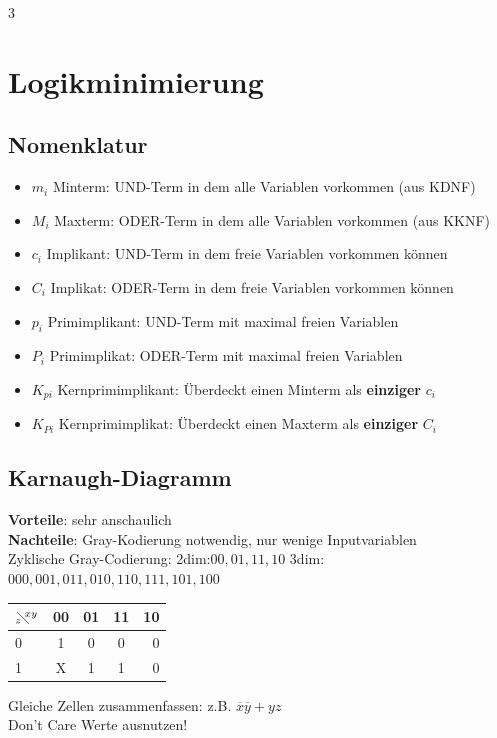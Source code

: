 \documentclass[6pt,a4paper]{scrartcl}
\begin{document}
\begin{multicols*}{3}
	\section{Logikminimierung}
	\subsection{Nomenklatur}
	\begin{itemize}\itemsep0pt
		\item $m_i$ Minterm: UND-Term in dem alle Variablen vorkommen (aus KDNF)
		\item $M_i$ Maxterm: ODER-Term in dem alle Variablen vorkommen (aus KKNF)
		\item $c_i$ Implikant: UND-Term in dem freie Variablen vorkommen können
		\item $C_i$ Implikat: ODER-Term in dem freie Variablen vorkommen können
		\item $p_i$ Primimplikant: UND-Term mit maximal freien Variablen
		\item $P_i$ Primimplikat: ODER-Term mit maximal freien Variablen
		\item $K_{pi}$ Kernprimimplikant: Überdeckt einen Minterm als \textbf{einziger} $c_i$
		\item $K_{Pi}$ Kernprimimplikat: Überdeckt einen Maxterm als \textbf{einziger} $C_i$
	\end{itemize}

	\subsection{Karnaugh-Diagramm} %
	\textbf{Vorteile}: sehr anschaulich\\
	\textbf{Nachteile}: Gray-Kodierung notwendig, nur wenige Inputvariablen\\
	Zyklische Gray-Codierung: 2dim:$00,01,11,10$ 3dim:$000,001,011,010,110,111,101,100$

	\begin{tabular}{l | c | c |  c | r}
		$_z\!\!\diagdown \!\!^{xy}$ & 00                 & 01                      & 11                      & 10 \\ \midrule
		0                           & 1 \cellcolor{gray} & 0                       & 0                       & 0  \\
		1                           & X \cellcolor{gray} & 1 \cellcolor{lightgray} & 1 \cellcolor{lightgray} & 0  \\
	\end{tabular}
	\begin{minipage}{\linewidth}
		Gleiche Zellen zusammenfassen: z.B. $\overline x \overline y + yz$ \\
		Don't Care Werte ausnutzen!
	\end{minipage}


\end{multicols*}
\end{document}
